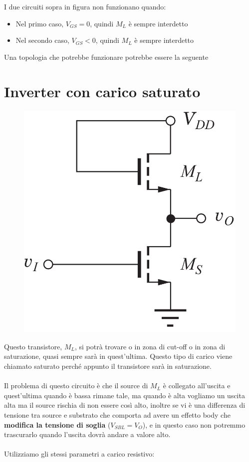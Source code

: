 I due circuiti sopra in figura non funzionano quando:

\begin{itemize}
    \item Nel primo caso, $V_{GS} = 0$, quindi $M_L$ è	sempre	interdetto
    \item Nel secondo caso, $V_{GS} < 0$, quindi $M_L$ è	sempre	interdetto
\end{itemize}

Una topologia che potrebbe funzionare potrebbe essere la seguente

\newpage
\section{Inverter con carico saturato}

    \begin{figure}[htbp]
        \centering
        \includegraphics[width=0.25\linewidth]{img/Inverte_saturato.png}        
        
    \end{figure}

Questo transistore, $M_L$, si potrà trovare o in zona di cut-off o in zona di saturazione, quasi sempre sarà in quest'ultima. Questo tipo di carico viene chiamato saturato perché appunto il transistore sarà in saturazione.
\paragraph{}

Il problema di questo circuito è che il source di $M_L$ è collegato all'uscita e quest'ultima quando è bassa rimane tale, ma quando è alta vogliamo un uscita alta ma il source rischia di non essere così alto, inoltre se vi è una differenza di tensione tra source e substrato che comporta ad avere un effetto body che \textbf{modifica la tensione di soglia} ($V_{SBL} = V_O$), e in questo caso non potremmo trascurarlo quando l'uscita dovrà andare a valore alto.

\paragraph{}
Utilizziamo gli stessi parametri a carico resistivo:

